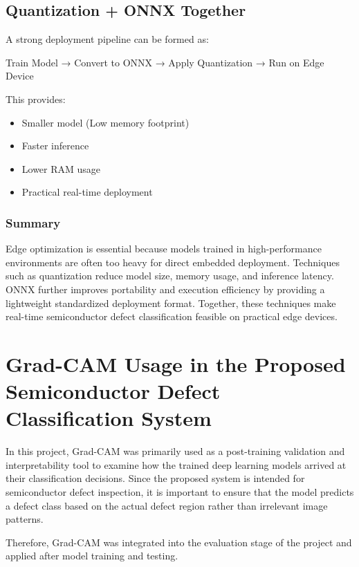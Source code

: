 \subsection{Quantization + ONNX Together}
A strong deployment pipeline can be formed as:

Train Model → Convert to ONNX → Apply Quantization → Run on Edge Device

This provides:
\begin{itemize}
\item Smaller model (Low memory footprint)
\item Faster inference
\item Lower RAM usage
\item Practical real-time deployment
\end{itemize}

\subsubsection{Summary}
Edge optimization is essential because models trained in high-performance environments are often too heavy for direct embedded deployment. Techniques such as quantization reduce model size, memory usage, and inference latency. ONNX further improves portability and execution efficiency by providing a lightweight standardized deployment format. Together, these techniques make real-time semiconductor defect classification feasible on practical edge devices.


\section{Grad-CAM Usage in the Proposed Semiconductor Defect Classification System}
In this project, Grad-CAM was primarily used as a post-training validation and interpretability tool to examine how the trained deep learning models arrived at their classification decisions. Since the proposed system is intended for semiconductor defect inspection, it is important to ensure that the model predicts a defect class based on the actual defect region rather than irrelevant image patterns.

Therefore, Grad-CAM was integrated into the evaluation stage of the project and applied after model training and testing.

